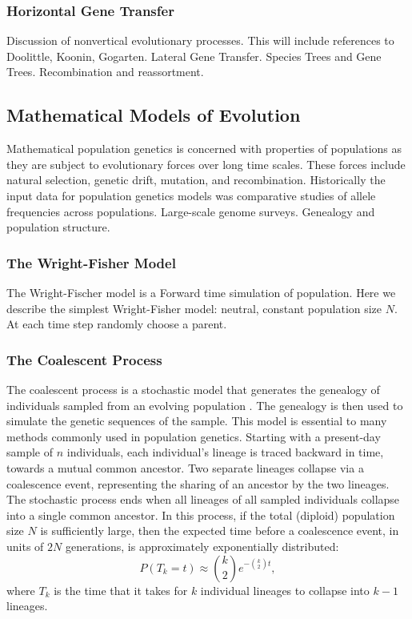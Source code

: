 \subsubsection{Horizontal Gene Transfer}

Discussion of nonvertical evolutionary processes.
This will include references to Doolittle, Koonin, Gogarten.
Lateral Gene Transfer.
Species Trees and Gene Trees.
Recombination and reassortment.

\subsection{Mathematical Models of Evolution}
\label{background:ss:evolutionary_models}

Mathematical population genetics is concerned with properties of populations as they are subject to evolutionary forces over long time scales.
These forces include natural selection, genetic drift, mutation, and recombination.
Historically the input data for population genetics models was comparative studies of allele frequencies across populations.
Large-scale genome surveys.
Genealogy and population structure.

\subsubsection{The Wright-Fisher Model}

The Wright-Fischer model is a 
Forward time simulation of population.
Here we describe the simplest Wright-Fisher model: neutral, constant population size $N$.
At each time step randomly choose a parent.

\subsubsection{The Coalescent Process}
\label{background:sss:coalescent}

The coalescent process is a stochastic model that generates the genealogy of individuals sampled from an evolving population \cite{Wakeley:2009}.
The genealogy is then used to simulate the genetic sequences of the sample.
This model is essential to many methods commonly used in population genetics.
Starting with a present-day sample of $n$ individuals, each individual's lineage is traced backward in time, towards a mutual common ancestor.
Two separate lineages collapse via a coalescence event, representing the sharing of an ancestor by the two lineages.
The stochastic process ends when all lineages of all sampled individuals collapse into a single common ancestor.
In this process, if the total (diploid) population size $N$ is sufficiently large, then the expected time before a coalescence event, in units of $2N$ generations, is approximately exponentially distributed:
\begin{equation}
P(T_{k}=t) \approx \binom{k}{2} e ^{-\binom{k}{2} t},
\end{equation}
where $T_k$ is the time that it takes for $k$ individual lineages to collapse into $k-1$ lineages.

